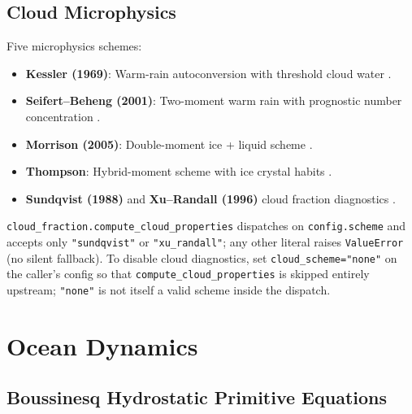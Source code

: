 \documentclass[11pt,a4paper]{article}
\begin{document}
\subsection{Cloud Microphysics}

Five microphysics schemes:
\begin{itemize}[nosep]
  \item \textbf{Kessler (1969)}: Warm-rain autoconversion with threshold cloud water \citep{Kessler1969}.
  \item \textbf{Seifert--Beheng (2001)}: Two-moment warm rain with prognostic number concentration \citep{SeifertBeheng2001}.
  \item \textbf{Morrison (2005)}: Double-moment ice + liquid scheme \citep{Morrison2005}.
  \item \textbf{Thompson}: Hybrid-moment scheme with ice crystal habits \citep{Thompson2008}.
  \item \textbf{Sundqvist (1988)} and \textbf{Xu--Randall (1996)} cloud fraction diagnostics \citep{Sundqvist1989,XuRandall1996}.
\end{itemize}
\texttt{cloud\_fraction.compute\_cloud\_properties} dispatches on
\texttt{config.scheme} and accepts only \texttt{"sundqvist"} or
\texttt{"xu\_randall"}; any other literal raises \texttt{ValueError}
(no silent fallback).  To disable cloud diagnostics, set
\texttt{cloud\_scheme="none"} on the caller's config so that
\texttt{compute\_cloud\_properties} is skipped entirely upstream;
\texttt{"none"} is not itself a valid scheme inside the dispatch.

\section{Ocean Dynamics}

\subsection{Boussinesq Hydrostatic Primitive Equations}
\end{document}
